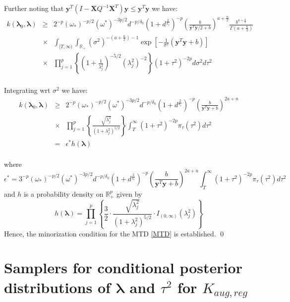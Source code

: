 \documentclass[noinfoline,11pt]{imsart}
\numberwithin{equation}{section}
\theoremstyle{plain}
\newcommand{\y}{\mathbf{y}}
\newcommand{\X}{\mathbf{X}}
\newcommand{\bl}{\boldsymbol{\lambda}}
\begin{document}
\noindent
Further noting that $\y^T\left(I-\X Q^{-1}\X^T\right)\y\leq \y^T\y$ we have:
\begin{eqnarray*}
k\left(\bl_0,\bl\right) &\geq& 2^{-p}\left(\omega_*\right)^{-p/2}\left(\omega^*\right)^{-3p/2}d^{-p/\delta_0}\left(1+d^{\frac{2}{\delta_1}}\right)^{-p}\left(\frac{b}{\y^T\y/2+b}\right)^{a+\frac{n}{2}}\frac{b^{a+\frac{n}{2}}}{\Gamma\left(a+\frac{n}{2}\right)} \nonumber \\
&\times& \int_{[T,\infty)}\int_{\mathbb{R}_+}
\left(\sigma^2\right)^{-\left(a+\frac{n}{2}\right)-1}\exp{\left[-\frac{1}{\sigma^2}(\y^T\y+b)\right]} \nonumber \\
&\times& \prod_{j=1}^p\left\{\left(1+\frac{1}{\lambda_j^2}\right)^{-5/2}\left(\lambda_j^2\right)^{-2}\right\}\left(1+\tau^2\right)^{-2p} d\sigma^2d\tau^2\nonumber \\
\end{eqnarray*}

\noindent
Integrating wrt $\sigma^2$ we have:
\begin{eqnarray*}
k\left(\bl_0,\bl\right) &\geq& 2^{-p}\left(\omega_*\right)^{-p/2}\left(\omega^*\right)^{-3p/2}d^{-p/\delta_0}\left(1+d^{\frac{2}{\delta_1}}\right)^{-p}\left(\frac{b}{\y^T\y+b}\right)^{2a+n} \nonumber \\
&\times&\prod_{j=1}^p\left\{\frac{\sqrt{\lambda_j^2}}{\left(1+\lambda_j^2\right)^{5/2}}\right\}\int_T^{\infty}\left(1+\tau^2\right)^{-2p}\pi_\tau\left(\tau^2\right)d\tau^2\nonumber \\
&=& \epsilon^* h\left(\bl\right) \nonumber \\
\end{eqnarray*}

\noindent

where 
$$\epsilon^*= 3^{-p}\left(\omega_*\right)^{-p/2}\left(\omega^*\right)^{-3p/2}d^{-p/\delta_0}\left(1+d^{\frac{2}{\delta_1}}\right)^{-p}\left(\frac{b}{\y^T\y+b}\right)^{2a+n}\int_T^{\infty}\left(1+\tau^2\right)^{-2p}\pi_\tau\left(\tau^2\right) d\tau^2$$
and $h$ is a probability density on $\mathbb{R}^p_+$ given by
$$h\left(\bl\right)=\prod_{j=1}^p\left\{\frac{3}{2}\cdot\frac{\sqrt{\lambda_j^2}}{\left(1+\lambda_j^2\right)^{5/2}}\cdot I_{(0,\infty)}\left(\lambda_j^2\right)\right\}$$
Hence, the minorization condition for the MTD \eqref{MTD} is established. \qed



\section{Samplers for conditional posterior distributions of $\bl$ and $\tau^2$ for $K_{aug,reg}$} \label{Appendix D}
\end{document}
